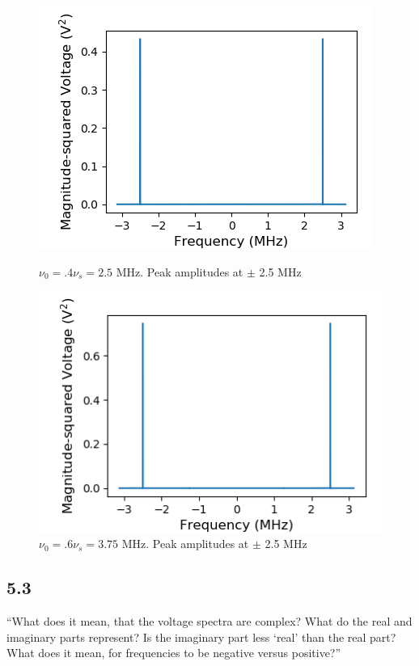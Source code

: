 \documentclass[a4paper]{article}
\begin{document}
\begin{figure}
\centering
\begin{minipage}{.5\textwidth}
	\centering
	\includegraphics[width=.8\linewidth]{5-2/pow4}
	\caption{$\nu_0 = .4 \nu_s = 2.5$ MHz. Peak amplitudes at $\pm$ 2.5 MHz}
	\label{fig:NyPw4}
\end{minipage}%
\begin{minipage}{.5\textwidth}
	\centering
	\includegraphics[width=.8\linewidth]{5-2/pow6}
	\caption{$\nu_0 = .6 \nu_s = 3.75$ MHz. Peak amplitudes at $\pm$ 2.5 MHz}
	\label{fig:NyPw6}
\end{minipage}
\end{figure}

\subsection{5.3}

``What does it mean, that the voltage spectra are complex? What do the real and imaginary
parts represent? Is the imaginary part less ‘real’ than the real part? What does it mean, for
frequencies to be negative versus positive?''
\end{document}
